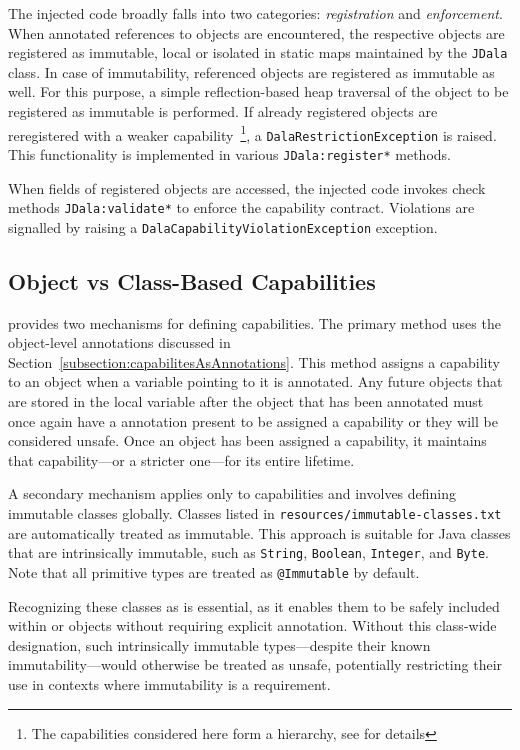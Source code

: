 The injected code broadly falls into two categories: \textit{registration} and \textit{enforcement}. When  annotated references to objects are encountered, the respective objects are registered as immutable, local or isolated in static maps maintained by the \texttt{JDala} class. In case of immutability, referenced objects are registered as immutable as well. For this purpose, a simple reflection-based  heap traversal of the object to be registered as immutable is performed.  If already registered objects are reregistered with a weaker capability~\footnote{The capabilities considered here form a hierarchy, see \cite{Dala_Paper} for details}, a \texttt{DalaRestrictionException} is raised.  This functionality is implemented in various \texttt{JDala:register*} methods.

When fields of registered objects are accessed, the injected code invokes check methods \texttt{JDala:validate*} to enforce the capability contract. Violations are signalled by raising a \texttt{DalaCapabilityViolationException} exception.




\subsection{Object vs Class-Based Capabilities}


\jdala provides two mechanisms for defining capabilities. The primary method uses the object-level annotations discussed in Section~\ref{subsection:capabilitesAsAnnotations}. This method assigns a capability to an object when a variable pointing to it is annotated. Any future objects that are stored in the local variable after the object that has been annotated must once again have a annotation present to be assigned a capability or they will be considered unsafe.
Once an object has been assigned a capability, it maintains that capability—or a stricter one—for its entire lifetime.

A secondary mechanism applies only to \Immutable capabilities and involves defining immutable classes globally. Classes listed in \texttt{resources/immutable-classes.txt} are automatically treated as immutable. This approach is suitable for Java classes that are intrinsically immutable, such as \texttt{String}, \texttt{Boolean}, \texttt{Integer}, and \texttt{Byte}. Note that all primitive types are treated as \texttt{@Immutable} by default.

Recognizing these classes as \Immutable is essential, as it enables them to be safely included within \Local or \Isolated objects without requiring explicit annotation. Without this class-wide designation, such intrinsically immutable types—despite their known immutability—would otherwise be treated as unsafe, potentially restricting their use in contexts where immutability is a requirement.


